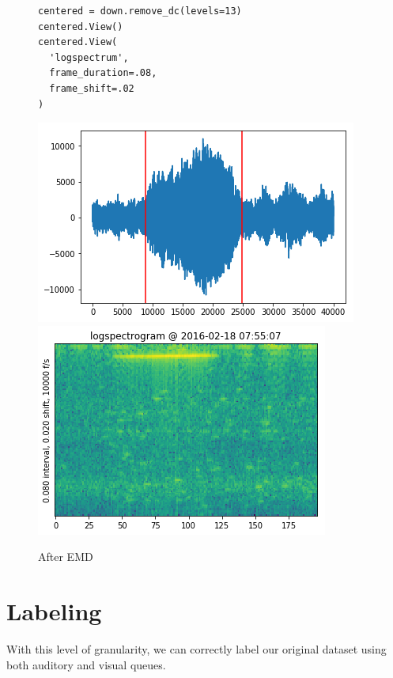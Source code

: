 \documentclass{article}
\begin{document}
\begin{multicols}{2}
\begin{figure}[H]
  \centering
  \begin{lstlisting}
centered = down.remove_dc(levels=13)
centered.View()
centered.View(
  'logspectrum',
  frame_duration=.08,
  frame_shift=.02
)
\end{lstlisting}
  \includegraphics[width=\columnwidth]{./centered.png}
  \includegraphics[width=\columnwidth]{./centeredspec.png}
  \caption{After EMD}
  \label{fig:emd}

\end{figure}

\section{Labeling}

With this level of granularity, we can correctly label our original dataset using both auditory and visual queues.


\end{multicols}
\end{document}
